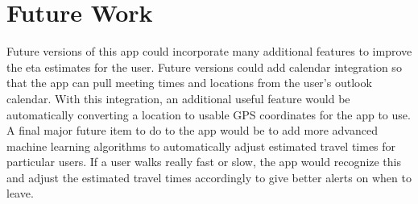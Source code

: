 \section{Future Work}
Future versions of this app could incorporate many additional features to improve the eta estimates for the user. Future versions could add calendar integration so that the app can pull meeting times and locations from the user's outlook calendar. With this integration, an additional useful feature would be automatically converting a location to usable GPS coordinates for the app to use. A final major future item to do to the app would be to add more advanced machine learning algorithms to automatically adjust estimated travel times for particular users. If a user walks really fast or slow, the app would recognize this and adjust the estimated travel times accordingly to give better alerts on when to leave.